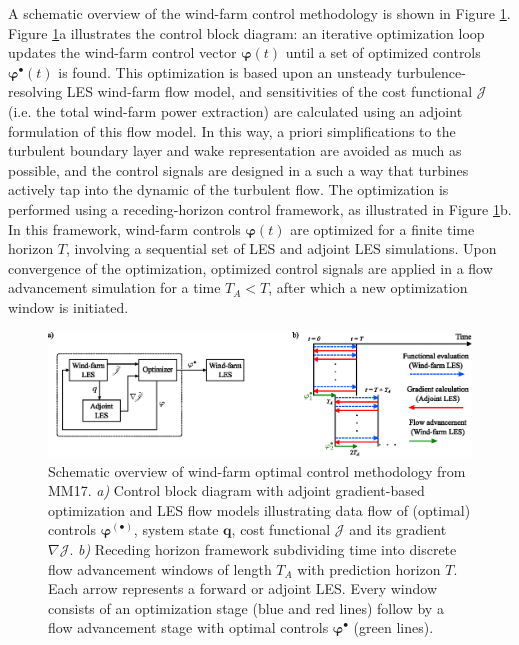 \documentclass[wes, manuscript]{copernicus}
\newcommand{\bs}[1]{\boldsymbol{#1}}
\newcommand{\J}{\mathscr{J}}
\begin{document}
A schematic overview of the wind-farm control methodology is shown in Figure \ref{fig:optimization_meth}. Figure \ref{fig:optimization_meth}a illustrates the control block diagram: an iterative optimization loop updates the wind-farm control vector $\bs{\varphi}(t)$ until a set of optimized controls $\bs{\varphi}^{\bullet}(t)$ is found. This optimization is based upon an unsteady turbulence-resolving LES wind-farm flow model, and sensitivities of the cost functional $\J$ (i.e. the total wind-farm power extraction) are calculated using an adjoint formulation of this flow model. In this way, a priori simplifications to the turbulent boundary layer and wake representation are avoided as much as possible, and the control signals are designed in a such a way that turbines actively tap into the dynamic of the turbulent flow. The optimization is performed using a receding-horizon control framework, as illustrated in Figure \ref{fig:optimization_meth}b. In this framework, wind-farm controls $\bs{\varphi}(t)$ are optimized for a finite time horizon $T$, involving a sequential set of LES and adjoint LES simulations. Upon convergence of the optimization, optimized control signals are applied in a flow advancement simulation for a time $T_A < T$, after which a new optimization window is initiated. 

\begin{figure}
	\includegraphics[width=\textwidth]{figure1.eps}
	\caption{Schematic overview of wind-farm optimal control methodology from MM17. \emph{a)} Control block diagram with adjoint gradient-based optimization and LES flow models illustrating data flow of (optimal) controls $\bs{\varphi}^{(\bullet)}$, system state $\bs{q}$, cost functional $\J$ and its gradient $\nabla \J$. \emph{b)} Receding horizon framework subdividing time into discrete flow advancement windows of length $T_A$ with prediction horizon $T$. Each arrow represents a forward or adjoint LES. Every window consists of an optimization stage (blue and red lines) follow by a flow advancement stage with optimal controls $\bs{\varphi}^{\bullet}$ (green lines).  \label{fig:optimization_meth}}
\end{figure}
\end{document}
